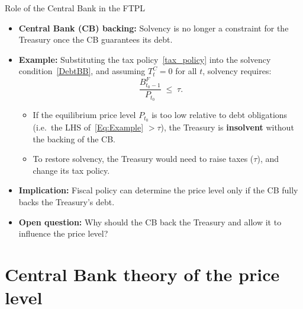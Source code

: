 \documentclass[11pt,aspectratio=169]{beamer}
\begin{document}
\begin{frame}{Role of the Central Bank in the FTPL}
\small
\begin{itemize}

  \item \textbf{Central Bank (CB) backing:}  
  Solvency is no longer a constraint for the Treasury once the CB guarantees its debt.

  \item \textbf{Example:}  
  Substituting the tax policy~\eqref{tax_policy} into the solvency condition~\eqref{DebtBB},  
  and assuming $T_t^{C} = 0$ for all $t$, solvency requires:
  \begin{equation}
    \frac{B^{F}_{t_0-1}}{P_{t_0}} \;\leq\; \tau.
    \label{Eq:Example}
  \end{equation}

  \begin{itemize}
    \item If the equilibrium price level $P_{t_0}$ is too low relative to debt obligations  
    (i.e.\ the LHS of~\eqref{Eq:Example} $> \tau$), the Treasury is \textbf{insolvent} without the backing of the CB.
    \item To restore solvency, the Treasury would need to raise taxes ($\tau$), and change its tax policy.
  \end{itemize}

  \item \textbf{Implication:}  
  Fiscal policy can determine the price level only if the CB fully backs the Treasury’s debt.

  \item \textbf{Open question:}  
  Why should the CB back the Treasury and allow it to influence the price level?

\end{itemize}
\end{frame}


\section{Central Bank theory of the price level}
\end{document}
